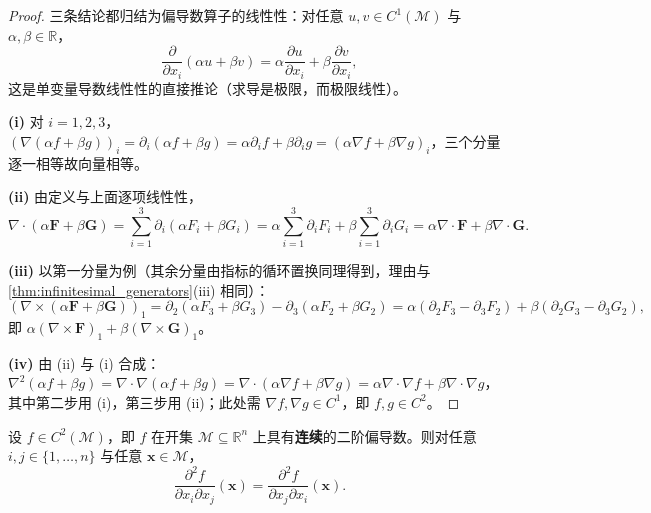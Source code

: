 \begin{proof}
三条结论都归结为偏导数算子的线性性：对任意 $u,v\in C^1(\mathcal M)$ 与 $\alpha,\beta\in\mathbb R$，
\[
\frac{\partial}{\partial x_i}(\alpha u+\beta v) = \alpha\frac{\partial u}{\partial x_i}+\beta\frac{\partial v}{\partial x_i},
\]
这是单变量导数线性性的直接推论（求导是极限，而极限线性）。

\textbf{(i)} 对 $i=1,2,3$，$(\nabla(\alpha f+\beta g))_i = \partial_i(\alpha f+\beta g) = \alpha\partial_i f+\beta\partial_i g = (\alpha\nabla f+\beta\nabla g)_i$，三个分量逐一相等故向量相等。

\textbf{(ii)} 由定义与上面逐项线性性，
\[
\nabla\cdot(\alpha\mathbf F+\beta\mathbf G) = \sum_{i=1}^3\partial_i(\alpha F_i+\beta G_i) = \alpha\sum_{i=1}^3\partial_iF_i+\beta\sum_{i=1}^3\partial_iG_i = \alpha\nabla\cdot\mathbf F+\beta\nabla\cdot\mathbf G .
\]

\textbf{(iii)} 以第一分量为例（其余分量由指标的循环置换同理得到，理由与 \cref{thm:infinitesimal_generators}(iii) 相同）：
\[
(\nabla\times(\alpha\mathbf F+\beta\mathbf G))_1 = \partial_2(\alpha F_3+\beta G_3)-\partial_3(\alpha F_2+\beta G_2)
= \alpha(\partial_2F_3-\partial_3F_2)+\beta(\partial_2G_3-\partial_3G_2),
\]
即 $\alpha(\nabla\times\mathbf F)_1+\beta(\nabla\times\mathbf G)_1$。

\textbf{(iv)} 由 (ii) 与 (i) 合成：$\nabla^2(\alpha f+\beta g) = \nabla\cdot\nabla(\alpha f+\beta g) = \nabla\cdot(\alpha\nabla f+\beta\nabla g) = \alpha\nabla\cdot\nabla f+\beta\nabla\cdot\nabla g$，其中第二步用 (i)，第三步用 (ii)；此处需 $\nabla f,\nabla g\in C^1$，即 $f,g\in C^2$。
\end{proof}

\begin{lemma}\label{lem:clairaut}
设 $f \in C^2(\mathcal{M})$，即 $f$ 在开集 $\mathcal M\subseteq\mathbb R^n$ 上具有\textbf{连续}的二阶偏导数。则对任意 $i,j \in \{1,\dots,n\}$ 与任意 $\mathbf x\in\mathcal M$，
\[
\frac{\partial^2 f}{\partial x_i \partial x_j}(\mathbf x)
=
\frac{\partial^2 f}{\partial x_j \partial x_i}(\mathbf x).
\]
\end{lemma}


